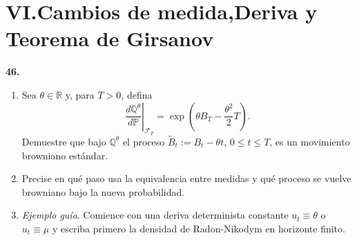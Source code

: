 \documentclass[11pt, letterpaper]{article}
\begin{document}
\newpage

\vspace{5mm}
\section{VI.Cambios de medida,Deriva y Teorema de Girsanov}

\vspace{3mm}

\begin{ejercicio}
    \textbf{46.} 
    \begin{enumerate}
        \item Sea $\theta \in \mathbb{R}$ y, para $T > 0$, defina
        \[ \left.\frac{d\mathbb{Q}^\theta}{d\mathbb{P}}\right|_{\mathcal{F}_T} = \exp\left( \theta B_T - \frac{\theta^2}{2} T \right). \]
        Demuestre que bajo $\mathbb{Q}^\theta$ el proceso $\tilde{B}_t := B_t - \theta t$, $0 \le t \le T$, es un movimiento browniano estándar.
        \item Precise en qué paso usa la equivalencia entre medidas y qué proceso se vuelve browniano bajo la nueva probabilidad.
        \item \textit{Ejemplo guía}. Comience con una deriva determinista constante $u_t \equiv \theta$ o $u_t \equiv \mu$ y escriba primero la densidad de Radon-Nikodym en horizonte finito.
    \end{enumerate}
\end{ejercicio}

\vspace{5mm}
\end{document}
